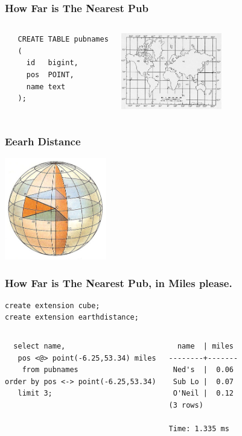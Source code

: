 \documentclass{beamer}
\begin{document}
\begin{frame}[fragile]
  \frametitle{How Far is The Nearest Pub}

  \vfill

\begin{columns}[c]

\begin{verbatim}
   CREATE TABLE pubnames
   (
     id   bigint,
     pos  POINT,
     name text
   );
\end{verbatim}  

\begin{center}
  \includegraphics[height=9em]{ltlng.jpg}
\end{center}
\end{columns}
\end{frame}

\begin{frame}[fragile]
  \frametitle{Eearh Distance}

\begin{center}
  \includegraphics[height=12em]{latitude_and_longitude.jpg}
\end{center}
\end{frame}

\begin{frame}[fragile]
  \frametitle{How Far is The Nearest Pub, in Miles please.}

\begin{verbatim}
create extension cube;
create extension earthdistance;
\end{verbatim}  
\vfill

\begin{columns}
\begin{verbatim}
  select name,
   pos <@> point(-6.25,53.34) miles
    from pubnames
order by pos <-> point(-6.25,53.34)
   limit 3;
\end{verbatim}  
\begin{verbatim}
  name  | miles 
--------+-------
 Ned's  |  0.06
 Sub Lo |  0.07
 O'Neil |  0.12
(3 rows)

Time: 1.335 ms
\end{verbatim}  
\end{columns}
\end{frame}
\end{document}
